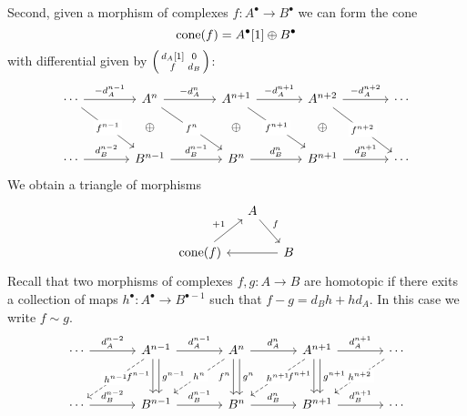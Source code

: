 \documentclass[number-in-sections,a4paper]{notes}
\begin{document}
Second, given a morphism of complexes $f\colon A^\bullet \to B^\bullet$ we can form the cone \[
    \operatorname{cone}(f) = A^\bullet[1] \oplus B^\bullet
\]
with differential given by $\begin{psmallmatrix}d_A[1] & 0 \\ f & d_B\end{psmallmatrix}$:
\[
    \begin{tikzcd}[column sep=large, row sep=small]
        \cdots \arrow[r, "-d_A^{n-1}"] \arrow[ddr, "f^{n-1}" description]
        &
        A^{n} \arrow[r, "-d_A^{n}"] \arrow[ddr, "f^n" description] 
        &
        A^{n+1} \arrow[r, "-d_A^{n+1}"] \arrow[ddr, "f^{n+1}" description]
        &
        A^{n+2} \arrow[r, "-d_A^{n+2}"] \arrow[ddr, "f^{n+2}" description]
        &
        \cdots
        \\
        & \oplus & \oplus & \oplus & \\
        \cdots \arrow[r, "d_B^{n-2}"]
        &
        B^{n-1} \arrow[r, "d_B^{n-1}"]
        &
        B^{n} \arrow[r, "d_B^{n}"]
        &
        B^{n+1} \arrow[r, "d_B^{n+1}"]
        &
        \cdots
    \end{tikzcd}
\]
We obtain a triangle of morphisms
\[
    \begin{tikzcd}[column sep=small]
        & A \arrow[dr, "f"] & \\
        \cone(f) \arrow[ur, "+1"] & & B \arrow[ll]
    \end{tikzcd}
\]
Recall that two morphisms of complexes $f,g\colon A \to B$ are homotopic if there exits a collection of maps $h^\bullet\colon A^\bullet \to B^{\bullet-1}$ such that $f-g = d_Bh + hd_A$.
In this case we write $f \sim g$.
\[
    \begin{tikzcd}[column sep=large, row sep=large]
        \cdots \arrow[r, "d_A^{n-2}"]
        &
        A^{n-1} \arrow[r, "d_A^{n-1}"] \arrow[dl, dashed, "h^{n-1}" description] \arrow[d, shift right, "f^{n-1}"'] \arrow[d, shift left, "g^{n-1}"]
        &
        A^{n} \arrow[r, "d_A^{n}"] \arrow[dl, dashed, "h^{n}" description] \arrow[d, shift right, "f^{n}"'] \arrow[d, shift left, "g^{n}"]
        &
        A^{n+1} \arrow[r, "d_A^{n+1}"] \arrow[dl, dashed, "h^{n+1}" description] \arrow[d, shift right, "f^{n+1}"'] \arrow[d, shift left, "g^{n+1}"]
        &
        \cdots \arrow[dl, dashed, "h^{n+2}" description]
        \\
        \cdots \arrow[r, "d_B^{n-2}"]
        &
        B^{n-1} \arrow[r, "d_B^{n-1}"]
        &
        B^{n} \arrow[r, "d_B^{n}"]
        &
        B^{n+1} \arrow[r, "d_B^{n+1}"]
        &
        \cdots
    \end{tikzcd}
\]
\end{document}
